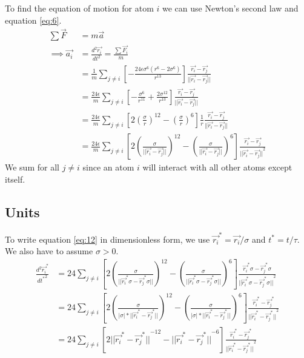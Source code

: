 \documentclass[a4paper,10pt,english]{article}
\begin{document}
To find the equation of motion for atom $i$ we can use Newton's second law and equation \ref{eq:6}.
\begin{align} \label{eq:12}
    \sum \Vec{F} &= m\Vec{a} \\
    \implies\Vec{a_i} &= \frac{d^2\Vec{r_i}}{dt^2} = \frac{\sum \Vec{F_i}}{m} \\
    &= \frac{1}{m} \sum_{j\neq i}{\left [-\frac{24\epsilon\sigma^6(r^6-2\sigma^6)}{r^{13}}\right] \frac{\Vec{r_i} - \Vec{r_j}}{||\Vec{r_i} - \Vec{r_j}||}} \\
    &= \frac{24\epsilon}{m} \sum_{j\neq i}{\left[-\frac{\sigma^6}{r^{11}} + \frac{2\sigma^{12}}{r^{13}}\right] \frac{\Vec{r_i} - \Vec{r_j}}{||\Vec{r_i} - \Vec{r_j}||}} \\
    &= \frac{24\epsilon}{m} \sum_{j\neq i}{\left[{2\left( \frac{\sigma}{r}\right)^{12} - \left( \frac{\sigma}{r}\right)^{6}}\right] \frac{1}{r} \frac{\Vec{r_i} - \Vec{r_j}}{||\Vec{r_i} - \Vec{r_j}||}} \\
    &= \frac{24\epsilon}{m} \sum_{j\neq i}{\left[{2\left( \frac{\sigma}{||\Vec{r_i} - \Vec{r_j}||}\right)^{12} - \left( \frac{\sigma}{||\Vec{r_i} - \Vec{r_j}||}\right)^{6}}\right] \frac{\Vec{r_i} - \Vec{r_j}}{{||\Vec{r_i} - \Vec{r_j}||}^2}}
\end{align}
We sum for all $j \neq i$ since an atom $i$ will interact with all other atoms except itself.

\subsection{Units} \label{1c}

To write equation \ref{eq:12} in dimensionless form, we use $\Vec{r_i}^*=\Vec{r_i}/\sigma$ and $t^*=t/\tau$. We also have to assume $\sigma>0$.
\begin{align}
    \frac{d^2 \Vec{r_i}^*}{d{t^*}^2} 
    &= 24 \sum_{j\neq i}{\left[{2\left( \frac{\sigma}{||\Vec{r_i}^*\sigma - \Vec{r_j}^*\sigma||}\right)^{12} - \left( \frac{\sigma}{||\Vec{r_i}^*\sigma - \Vec{r_j}^*\sigma||}\right)^{6}}\right] \frac{\Vec{r_i}^*\sigma - \Vec{r_j}^*\sigma}{{||\Vec{r_i}^*\sigma - \Vec{r_j}^*\sigma||}^2}} \\
    &= 24 \sum_{j\neq i}{\left[{2\left( \frac{\sigma}{|\sigma|*||\Vec{r_i}^* - \Vec{r_j}^*||}\right)^{12} - \left( \frac{\sigma}{|\sigma|*||\Vec{r_i}^* - \Vec{r_j}^*||}\right)^{6}}\right] \frac{\Vec{r_i}^* - \Vec{r_j}^*}{{||\Vec{r_i}^* - \Vec{r_j}^*||}^2}} \\
    &= 24 \sum_{j\neq i}{\left[{2{||\Vec{r_i}^* - \Vec{r_j}^*||}^{-12} - {||\Vec{r_i}^* - \Vec{r_j}^*||}^{-6}}\right] \frac{\Vec{r_i}^* - \Vec{r_j}^*}{{||\Vec{r_i}^* - \Vec{r_j}^*||}^2}} 
\end{align}
\end{document}
